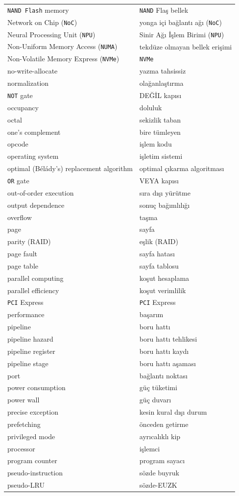 {\begin{longtable}{@{}p{7.6cm}p{7.6cm}@{}}
\texttt{NAND Flash} memory & \texttt{NAND} Flaş bellek \\
Network on Chip (\texttt{NoC}) & yonga içi bağlantı ağı (\texttt{NoC}) \\
Neural Processing Unit (\texttt{NPU}) & Sinir Ağı İşlem Birimi (\texttt{NPU}) \\
Non-Uniform Memory Access (\texttt{NUMA}) & tekdüze olmayan bellek erişimi \\
Non-Volatile Memory Express (\texttt{NVMe}) & \texttt{NVMe} \\
no-write-allocate & yazma tahsissiz \\
normalization & olağanlaştırma \\
\texttt{NOT} gate & DEĞİL kapısı \\

occupancy & doluluk \\
octal & sekizlik taban \\
one's complement & bire tümleyen \\
opcode & işlem kodu \\
operating system & işletim sistemi \\
optimal (Bélády's) replacement algorithm & optimal çıkarma algoritması \\
\texttt{OR} gate & VEYA kapısı \\
out-of-order execution & sıra dışı yürütme \\
output dependence & sonuç bağımlılığı \\
overflow & taşma \\

page & sayfa \\
parity (RAID) & eşlik (RAID) \\
page fault & sayfa hatası \\
page table & sayfa tablosu \\
parallel computing & koşut hesaplama \\
parallel efficiency & koşut verimlilik \\
\texttt{PCI} Express & \texttt{PCI} Express \\
performance & başarım \\
pipeline & boru hattı \\
pipeline hazard & boru hattı tehlikesi \\
pipeline register & boru hattı kaydı \\
pipeline stage & boru hattı aşaması \\
port & bağlantı noktası \\
power consumption & güç tüketimi \\
power wall & güç duvarı \\
precise exception & kesin kural dışı durum \\
prefetching & önceden getirme \\
privileged mode & ayrıcalıklı kip \\
processor & işlemci \\
program counter & program sayacı \\
pseudo-instruction & sözde buyruk \\
pseudo-LRU & sözde-EUZK \\


\end{longtable}}
